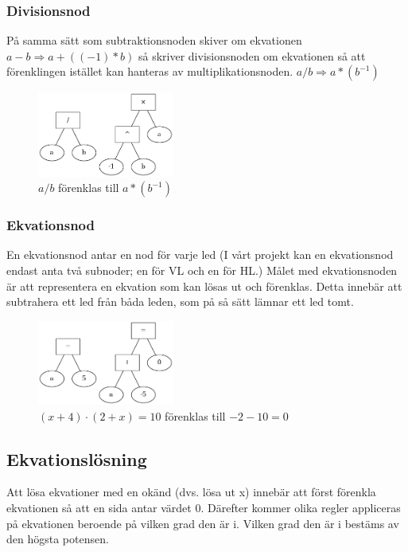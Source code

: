 \documentclass[12pt,a4paper]{article}
\begin{document}
\subsubsection{Divisionsnod}
På samma sätt som subtraktionsnoden skiver om ekvationen \(a-b\Rightarrow a+((-1)*b)\) så skriver divisionsnoden om ekvationen så att förenklingen istället kan hanteras av multiplikationsnoden. \(a/b\Rightarrow a*(b^{-1})\)
\begin{figure}[h!]
  \centering
  \includegraphics[width=0.4\textwidth]{image-merged4.png}
  \caption{\(a/b\) förenklas till \(a*(b^{-1})\)}
\end{figure}
\subsubsection{Ekvationsnod}
En ekvationsnod antar en nod för varje led (I vårt projekt kan en ekvationsnod endast anta två subnoder; en för VL och en för HL.) Målet med ekvationsnoden är att representera en ekvation som kan lösas ut och förenklas. Detta innebär att subtrahera ett led från båda leden, som på så sätt lämnar ett led tomt.
\begin{figure}[h!]
  \centering
  \includegraphics[width=0.4\textwidth]{image-merged5.png}
  \caption{\((x+4)\cdot (2+x)=10\) förenklas till \(-2-10=0\)}
\end{figure}
\subsection{Ekvationslösning}
Att lösa ekvationer med en okänd (dvs. lösa ut x) innebär att först förenkla ekvationen så att en sida antar värdet 0. Därefter kommer olika regler appliceras på ekvationen beroende på vilken grad den är i. Vilken grad den är i bestäms av den högsta potensen.
\end{document}
